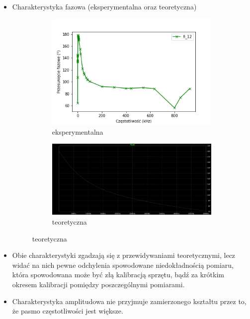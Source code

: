 \begin{itemize}
    \item Charakterystyka fazowa (eksperymentalna oraz teoretyczna)
        \begin{figure}[H]
        \centering
        \begin{subfigure}[h]{0.45\textwidth}
            \includegraphics[width=\textwidth]{img/osciloscope/charakterystyka/fazowa.png}
            \caption*{eksperymentalna}
        \end{subfigure}
        \begin{subfigure}[h]{0.45\textwidth}
            \includegraphics[width=\textwidth]{img/theoretical/charakterystyka_fazowa_wzmacniacz.png}
            \caption*{teoretyczna}
        \end{subfigure}
    \end{figure}
    \item Obie charakterystyki zgadzają się z przewidywaniami teoretycznymi, lecz widać na nich pewne odchylenia spowodowane niedokładnością pomiaru, która spowodowana może być złą kalibracją sprzętu, bądź za krótkim okresem kalibracji pomiędzy poszczególnymi pomiarami.
    \item Charakterystyka amplitudowa nie przyjmuje zamierzonego kształtu przez to, że pasmo częstotliwości jest większe.
\end{itemize}